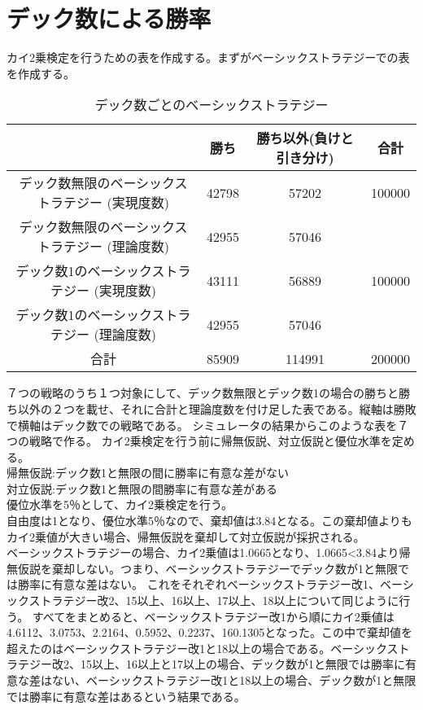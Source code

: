 \section{デック数による勝率}
カイ2乗検定を行うための表を作成する。まずがベーシックストラテジーでの表を作成する。
\begin{table}[H]
 \begin{center}
  \begin{tabular}{|c|c|c|c|}
    \hline
      & 勝ち & 勝ち以外(負けと引き分け) & 合計 \\
    \hline デック数無限のベーシックストラテジー (実現度数)& 42798 & 57202 & 100000 \\
            デック数無限のベーシックストラテジー (理論度数)& 42955 & 57046 &  \\
    \hline デック数1のベーシックストラテジー (実現度数)& 43111 & 56889 & 100000 \\
            デック数1のベーシックストラテジー (理論度数)& 42955 & 57046 &  \\
    \hline  合計 & 85909 & 114991 & 200000 \\
    \hline
  \end{tabular}
 \end{center}
 \caption{デック数ごとのベーシックストラテジー}
\end{table}
７つの戦略のうち１つ対象にして、デック数無限とデック数1の場合の勝ちと勝ち以外の２つを載せ、それに合計と理論度数を付け足した表である。縦軸は勝敗で横軸はデック数での戦略である。
シミュレータの結果からこのような表を７つの戦略で作る。
カイ2乗検定を行う前に帰無仮説、対立仮説と優位水準を定める。\\
帰無仮説:デック数1と無限の間に勝率に有意な差がない\\
対立仮説:デック数1と無限の間勝率に有意な差がある\\
優位水準を5％として、カイ2乗検定を行う。\\
自由度は1となり、優位水準5％なので、棄却値は3.84となる。この棄却値よりもカイ2乗値が大きい場合、帰無仮説を棄却して対立仮説が採択される。\\
ベーシックストラテジーの場合、カイ2乗値は1.0665となり、1.0665<3.84より帰無仮説を棄却しない。つまり、ベーシックストラテジーでデック数が1と無限では勝率に有意な差はない。
これをそれぞれベーシックストラテジー改1、ベーシックストラテジー改2、15以上、16以上、17以上、18以上について同じように行う。
すべてをまとめると、ベーシックストラテジー改1から順にカイ2乗値は4.6112、3.0753、2.2164、0.5952、0.2237、160.1305となった。この中で棄却値を超えたのはベーシックストラテジー改1と18以上の場合である。ベーシックストラテジー改2、15以上、16以上と17以上の場合、デック数が1と無限では勝率に有意な差はない、ベーシックストラテジー改1と18以上の場合、デック数が1と無限では勝率に有意な差はあるという結果である。
